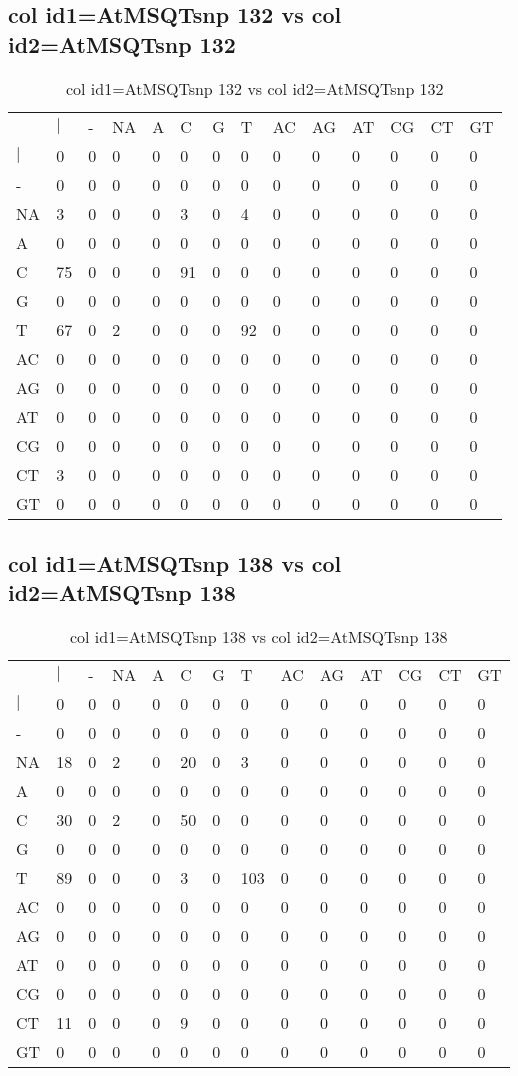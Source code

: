 \subsection{col id1=AtMSQTsnp 132 vs col id2=AtMSQTsnp 132}
\begin{center}
\begin{longtable}{|l|l|l|l|l|l|l|l|l|l|l|l|l|l|}
\caption{col id1=AtMSQTsnp 132 vs col id2=AtMSQTsnp 132} \label{table_dm710}\\
\hline
\\
\hline
&$|$&-&NA&A&C&G&T&AC&AG&AT&CG&CT&GT\\
$|$&0&0&0&0&0&0&0&0&0&0&0&0&0\\
-&0&0&0&0&0&0&0&0&0&0&0&0&0\\
NA&3&0&0&0&3&0&4&0&0&0&0&0&0\\
A&0&0&0&0&0&0&0&0&0&0&0&0&0\\
C&75&0&0&0&91&0&0&0&0&0&0&0&0\\
G&0&0&0&0&0&0&0&0&0&0&0&0&0\\
T&67&0&2&0&0&0&92&0&0&0&0&0&0\\
AC&0&0&0&0&0&0&0&0&0&0&0&0&0\\
AG&0&0&0&0&0&0&0&0&0&0&0&0&0\\
AT&0&0&0&0&0&0&0&0&0&0&0&0&0\\
CG&0&0&0&0&0&0&0&0&0&0&0&0&0\\
CT&3&0&0&0&0&0&0&0&0&0&0&0&0\\
GT&0&0&0&0&0&0&0&0&0&0&0&0&0\\
\hline
\end{longtable}
\end{center}

\subsection{col id1=AtMSQTsnp 138 vs col id2=AtMSQTsnp 138}
\begin{center}
\begin{longtable}{|l|l|l|l|l|l|l|l|l|l|l|l|l|l|}
\caption{col id1=AtMSQTsnp 138 vs col id2=AtMSQTsnp 138} \label{table_dm712}\\
\hline
\\
\hline
&$|$&-&NA&A&C&G&T&AC&AG&AT&CG&CT&GT\\
$|$&0&0&0&0&0&0&0&0&0&0&0&0&0\\
-&0&0&0&0&0&0&0&0&0&0&0&0&0\\
NA&18&0&2&0&20&0&3&0&0&0&0&0&0\\
A&0&0&0&0&0&0&0&0&0&0&0&0&0\\
C&30&0&2&0&50&0&0&0&0&0&0&0&0\\
G&0&0&0&0&0&0&0&0&0&0&0&0&0\\
T&89&0&0&0&3&0&103&0&0&0&0&0&0\\
AC&0&0&0&0&0&0&0&0&0&0&0&0&0\\
AG&0&0&0&0&0&0&0&0&0&0&0&0&0\\
AT&0&0&0&0&0&0&0&0&0&0&0&0&0\\
CG&0&0&0&0&0&0&0&0&0&0&0&0&0\\
CT&11&0&0&0&9&0&0&0&0&0&0&0&0\\
GT&0&0&0&0&0&0&0&0&0&0&0&0&0\\
\hline
\end{longtable}
\end{center}

